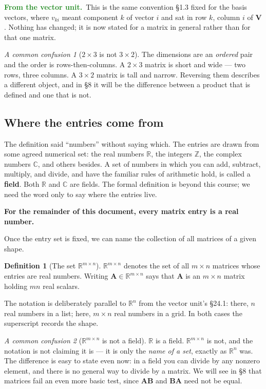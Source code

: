\documentclass[11pt]{article}
\theoremstyle{plain}
\theoremstyle{definition}
\newtheorem{defn}{Definition}[section]
\theoremstyle{remark}
\newtheorem*{warn}{A common confusion}
\newcommand{\lookback}{\par\smallskip\noindent
  \textbf{\sffamily\textcolor{ForestGreen}{From the vector unit.}}\ \ignorespaces}
\newcommand{\R}{\mathbb{R}}
\newcommand{\mt}[1]{\mathbf{#1}}        %
\newcommand{\Z}{\mathbb{Z}}
\newcommand{\C}{\mathbb{C}}
\begin{document}
\lookback This is the same convention \S1.3 fixed for the basis vectors, where
$v_{ki}$ meant component $k$ of vector $i$ and sat in row $k$, column $i$ of
$\mt{V}$. Nothing has changed; it is now stated for a matrix in general rather
than for that one matrix.

\begin{warn}[$2\times3$ is not $3\times2$]
The dimensions are an \emph{ordered} pair and the order is rows-then-columns. A
$2\times3$ matrix is short and wide --- two rows, three columns. A $3\times2$
matrix is tall and narrow. Reversing them describes a different object, and in
\S8 it will be the difference between a product that is defined and one that is
not.
\end{warn}

\subsection{Where the entries come from}
The definition said ``numbers'' without saying which. The entries are drawn from
some agreed numerical set: the real numbers $\R$, the integers $\Z$, the complex
numbers $\C$, and others besides. A set of numbers in which you can add,
subtract, multiply, and divide, and have the familiar rules of arithmetic hold,
is called a \textbf{field}. Both $\R$ and $\C$ are fields. The formal definition
is beyond this course; we need the word only to say where the entries live.

\medskip
\noindent\textbf{For the remainder of this document, every matrix entry is a
real number.}

Once the entry set is fixed, we can name the collection of all matrices of a
given shape.

\begin{defn}[The set $\R^{m\times n}$]
$\R^{m\times n}$ denotes the set of all $m\times n$ matrices whose entries are
real numbers. Writing $\mt{A}\in\R^{m\times n}$ says that $\mt{A}$ is an
$m\times n$ matrix holding $mn$ real scalars.
\end{defn}

\noindent The notation is deliberately parallel to $\R^{n}$ from the vector
unit's \S24.1: there, $n$ real numbers in a list; here, $m\times n$ real numbers
in a grid. In both cases the superscript records the shape.

\begin{warn}[$\R^{m\times n}$ is not a field]
$\R$ is a field. $\R^{m\times n}$ is not, and the notation is not claiming it
is --- it is only the \emph{name of a set}, exactly as $\R^{n}$ was. The
difference is easy to state even now: in a field you can divide by any nonzero
element, and there is no general way to divide by a matrix. We will see in \S8
that matrices fail an even more basic test, since $\mt{A}\mt{B}$ and
$\mt{B}\mt{A}$ need not be equal.
\end{warn}
\end{document}
